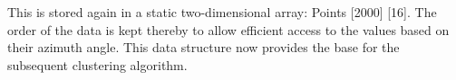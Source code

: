 \documentclass[11pt,oneside,openright]{mpreport}
\begin{document}
This is stored  again  in a static two-dimensional array: Points [2000] [16]. The order of the data is kept thereby to allow efficient access to 
the values based on their azimuth angle. This data structure now provides the base for the subsequent clustering algorithm.

\end{document}
